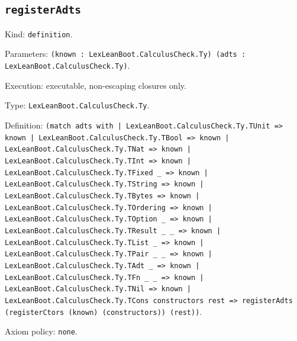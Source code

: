 \documentclass[11pt]{article}
\begin{document}
\subsection*{\texttt{registerAdts}}
\noindent Kind: \texttt{definition}.\par
\noindent Parameters: \texttt{(known : LexLeanBoot.CalculusCheck.Ty) (adts : LexLeanBoot.CalculusCheck.Ty)}.\par
\noindent Execution: executable, non-escaping closures only.\par
\noindent Type: \texttt{LexLeanBoot.CalculusCheck.Ty}.\par
\noindent Definition: \texttt{(match adts with | LexLeanBoot.CalculusCheck.Ty.TUnit => known | LexLeanBoot.CalculusCheck.Ty.TBool => known | LexLeanBoot.CalculusCheck.Ty.TNat => known | LexLeanBoot.CalculusCheck.Ty.TInt => known | LexLeanBoot.CalculusCheck.Ty.TFixed \_ => known | LexLeanBoot.CalculusCheck.Ty.TString => known | LexLeanBoot.CalculusCheck.Ty.TBytes => known | LexLeanBoot.CalculusCheck.Ty.TOrdering => known | LexLeanBoot.CalculusCheck.Ty.TOption \_ => known | LexLeanBoot.CalculusCheck.Ty.TResult \_ \_ => known | LexLeanBoot.CalculusCheck.Ty.TList \_ => known | LexLeanBoot.CalculusCheck.Ty.TPair \_ \_ => known | LexLeanBoot.CalculusCheck.Ty.TAdt \_ => known | LexLeanBoot.CalculusCheck.Ty.TFn \_ \_ => known | LexLeanBoot.CalculusCheck.Ty.TNil => known | LexLeanBoot.CalculusCheck.Ty.TCons constructors rest => registerAdts (registerCtors (known) (constructors)) (rest))}.\par
\noindent Axiom policy: \texttt{none}.\par
\end{document}
